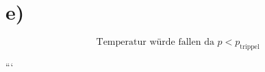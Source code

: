 

\section*{e)}

\begin{equation*}
\text{Temperatur würde fallen da } p < p_{\text{trippel}}
\end{equation*}

```